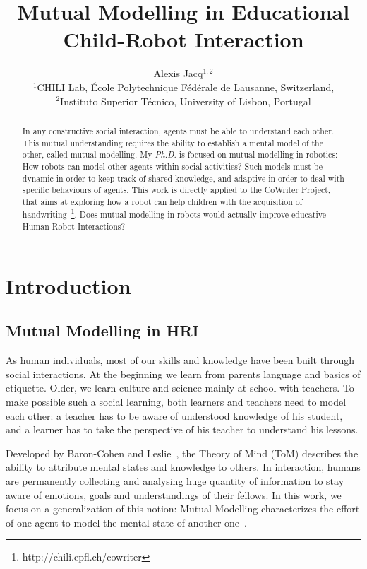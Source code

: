 \documentclass[10pt,a4paper]{article}
\begin{document}
\title{Mutual Modelling in Educational Child-Robot Interaction}


\author{Alexis Jacq$^{1,2}$\\
$^1$CHILI Lab, \'Ecole Polytechnique F\'ed\'erale de Lausanne, Switzerland,\\
$^2$Instituto Superior T\'{e}cnico, University of Lisbon, Portugal}



\maketitle
\begin{abstract}
In any constructive social interaction, agents must be able to understand each other. This mutual understanding requires the ability to establish a mental model of the other, called mutual modelling. My \textit{Ph.D.} is focused on mutual modelling in robotics: How robots can model other agents within social activities? Such models must be dynamic in order to keep track of shared knowledge, and adaptive in order to deal with specific behaviours of agents. 
This work is directly applied to the CoWriter Project, that aims at exploring how a robot can help children with the acquisition of handwriting~\footnote{http://chili.epfl.ch/cowriter}. Does mutual modelling in robots would actually improve educative Human-Robot Interactions?
\end{abstract}

\section{Introduction}
\subsection{Mutual Modelling in HRI}

As human individuals, most of our skills and knowledge have been built through social interactions. At the beginning we learn from parents language and basics of etiquette.  Older, we learn culture and science mainly at school with teachers. To make possible such a social learning, both learners and teachers need to model each other: a teacher has to be aware of understood knowledge of his student, and a learner has to take the perspective of his teacher to understand his lessons. 

Developed by Baron-Cohen and Leslie~\cite{baron1985does}, the Theory of Mind (ToM) describes the ability to attribute mental states and knowledge to others. In interaction, humans are permanently collecting and analysing huge quantity of information to stay aware of emotions, goals and understandings of their fellows. In this work, we focus on a generalization of this notion: Mutual Modelling characterizes the effort of one agent to model the mental state of another one~\cite{dillenbourg1999you}. 
\end{document}
